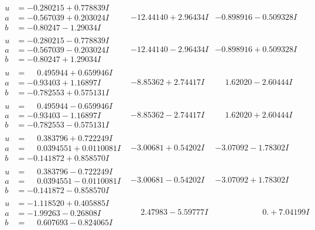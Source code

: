 \documentclass[1p]{elsarticle_modified}
\theoremstyle{definition}
\begin{document}
$$\begin{array}{c|c|c}
\begin{aligned}
u &= -0.280215 + 0.778839 I \\
a &= -0.567039 + 0.203024 I \\
b &= -0.80247 - 1.29034 I\end{aligned}
 & -12.44140 + 2.96434 I & -0.898916 - 0.509328 I \\ \hline\begin{aligned}
u &= -0.280215 - 0.778839 I \\
a &= -0.567039 - 0.203024 I \\
b &= -0.80247 + 1.29034 I\end{aligned}
 & -12.44140 - 2.96434 I & -0.898916 + 0.509328 I \\ \hline\begin{aligned}
u &= \phantom{-}0.495944 + 0.659946 I \\
a &= -0.93403 + 1.16897 I \\
b &= -0.782553 + 0.575131 I\end{aligned}
 & -8.85362 + 2.74417 I & \phantom{-}1.62020 - 2.60444 I \\ \hline\begin{aligned}
u &= \phantom{-}0.495944 - 0.659946 I \\
a &= -0.93403 - 1.16897 I \\
b &= -0.782553 - 0.575131 I\end{aligned}
 & -8.85362 - 2.74417 I & \phantom{-}1.62020 + 2.60444 I \\ \hline\begin{aligned}
u &= \phantom{-}0.383796 + 0.722249 I \\
a &= \phantom{-}0.0394551 + 0.0110081 I \\
b &= -0.141872 + 0.858570 I\end{aligned}
 & -3.00681 + 0.54202 I & -3.07092 - 1.78302 I \\ \hline\begin{aligned}
u &= \phantom{-}0.383796 - 0.722249 I \\
a &= \phantom{-}0.0394551 - 0.0110081 I \\
b &= -0.141872 - 0.858570 I\end{aligned}
 & -3.00681 - 0.54202 I & -3.07092 + 1.78302 I \\ \hline\begin{aligned}
u &= -1.118520 + 0.405885 I \\
a &= -1.99263 - 0.26808 I \\
b &= \phantom{-}0.607693 - 0.824065 I\end{aligned}
 & \phantom{-}2.47983 - 5.59777 I & \phantom{-0.000000 -}0. + 7.04199 I \\ \hline\begin{aligned}

\end{aligned}
\end{array}$$
\end{document}
